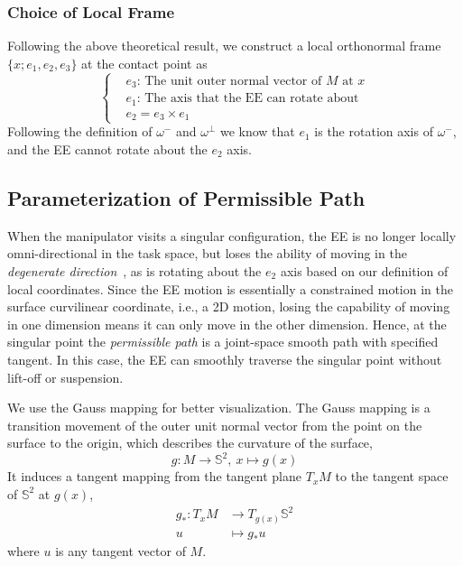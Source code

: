 \documentclass[Afour,sageh,times]{sagej}
\begin{document}
\subsubsection{Choice of Local Frame}
Following the above theoretical result, we construct a local orthonormal frame $\{x; e_1, e_2, e_3\}$ at the contact point as 
\begin{equation}
\left\{
\begin{aligned}
&e_3\mbox{: The unit outer normal vector of $M$ at $x$}\\ 
&e_1\mbox{: The axis that the EE can rotate about}\\ 
&e_2 = e_3\times e_1
\end{aligned}
\right.
\end{equation}
Following the definition of $\omega^-$ and $\omega^\perp$ we know that $e_1$ is the rotation axis of $\omega^-$, and the EE cannot rotate about the $e_2$ axis. 

\subsection{Parameterization of Permissible Path}\label{subsection_parameterization}
When the manipulator visits a singular configuration, the EE is no longer locally omni-directional in the task space, but loses the ability of moving in the \textit{degenerate direction}~\cite{Egeland1991Manipulator}, as is rotating about the $e_2$ axis based on our definition of local coordinates. 
Since the EE motion is essentially a constrained motion in the surface curvilinear coordinate, i.e., a 2D motion, losing the capability of moving in one dimension means it can only move in the other dimension. 
Hence, at the singular point the \textit{permissible path} is a joint-space smooth path with specified tangent.
In this case, the EE can smoothly traverse the singular point without lift-off or suspension. 

We use the Gauss mapping for better visualization. 
The Gauss mapping is a transition movement of the outer unit normal vector from the point on the surface to the origin, which describes the curvature of the surface,
\begin{equation}
g: M\rightarrow \mathbb{S}^2,\ x\mapsto g(x)
\end{equation}
It induces a tangent mapping from the tangent plane $T_xM$ to the tangent space of $\mathbb{S}^2$ at $g(x)$,
\begin{equation}
\begin{aligned}
g_*: T_xM&\rightarrow T_{g(x)}\mathbb{S}^2\\
u&\mapsto g_*u
\end{aligned}
\end{equation}
where $u$ is any tangent vector of $M$. 
\end{document}
